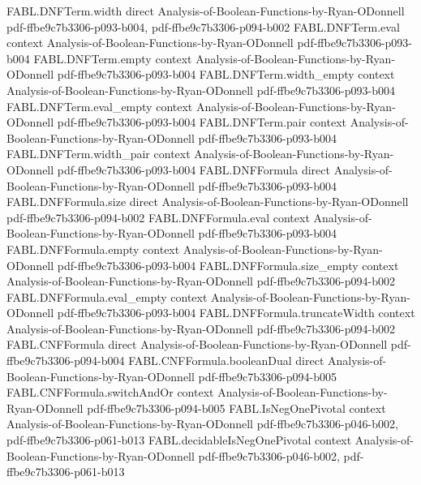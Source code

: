 \begin{theorem}
\proofstep
  {FABL.DNFTerm.width}
  {direct}
  {Analysis-of-Boolean-Functions-by-Ryan-ODonnell}
  {pdf-ffbe9c7b3306-p093-b004,
    pdf-ffbe9c7b3306-p094-b002}
\proofstep
  {FABL.DNFTerm.eval}
  {context}
  {Analysis-of-Boolean-Functions-by-Ryan-ODonnell}
  {pdf-ffbe9c7b3306-p093-b004}
\proofstep
  {FABL.DNFTerm.empty}
  {context}
  {Analysis-of-Boolean-Functions-by-Ryan-ODonnell}
  {pdf-ffbe9c7b3306-p093-b004}
\proofstep
  {FABL.DNFTerm.width_empty}
  {context}
  {Analysis-of-Boolean-Functions-by-Ryan-ODonnell}
  {pdf-ffbe9c7b3306-p093-b004}
\proofstep
  {FABL.DNFTerm.eval_empty}
  {context}
  {Analysis-of-Boolean-Functions-by-Ryan-ODonnell}
  {pdf-ffbe9c7b3306-p093-b004}
\proofstep
  {FABL.DNFTerm.pair}
  {context}
  {Analysis-of-Boolean-Functions-by-Ryan-ODonnell}
  {pdf-ffbe9c7b3306-p093-b004}
\proofstep
  {FABL.DNFTerm.width_pair}
  {context}
  {Analysis-of-Boolean-Functions-by-Ryan-ODonnell}
  {pdf-ffbe9c7b3306-p093-b004}
\proofstep
  {FABL.DNFFormula}
  {direct}
  {Analysis-of-Boolean-Functions-by-Ryan-ODonnell}
  {pdf-ffbe9c7b3306-p093-b004}
\proofstep
  {FABL.DNFFormula.size}
  {direct}
  {Analysis-of-Boolean-Functions-by-Ryan-ODonnell}
  {pdf-ffbe9c7b3306-p094-b002}
\proofstep
  {FABL.DNFFormula.eval}
  {context}
  {Analysis-of-Boolean-Functions-by-Ryan-ODonnell}
  {pdf-ffbe9c7b3306-p093-b004}
\proofstep
  {FABL.DNFFormula.empty}
  {context}
  {Analysis-of-Boolean-Functions-by-Ryan-ODonnell}
  {pdf-ffbe9c7b3306-p093-b004}
\proofstep
  {FABL.DNFFormula.size_empty}
  {context}
  {Analysis-of-Boolean-Functions-by-Ryan-ODonnell}
  {pdf-ffbe9c7b3306-p094-b002}
\proofstep
  {FABL.DNFFormula.eval_empty}
  {context}
  {Analysis-of-Boolean-Functions-by-Ryan-ODonnell}
  {pdf-ffbe9c7b3306-p093-b004}
\proofstep
  {FABL.DNFFormula.truncateWidth}
  {context}
  {Analysis-of-Boolean-Functions-by-Ryan-ODonnell}
  {pdf-ffbe9c7b3306-p094-b002}
\proofstep
  {FABL.CNFFormula}
  {direct}
  {Analysis-of-Boolean-Functions-by-Ryan-ODonnell}
  {pdf-ffbe9c7b3306-p094-b004}
\proofstep
  {FABL.CNFFormula.booleanDual}
  {direct}
  {Analysis-of-Boolean-Functions-by-Ryan-ODonnell}
  {pdf-ffbe9c7b3306-p094-b005}
\proofstep
  {FABL.CNFFormula.switchAndOr}
  {context}
  {Analysis-of-Boolean-Functions-by-Ryan-ODonnell}
  {pdf-ffbe9c7b3306-p094-b005}
\proofstep
  {FABL.IsNegOnePivotal}
  {context}
  {Analysis-of-Boolean-Functions-by-Ryan-ODonnell}
  {pdf-ffbe9c7b3306-p046-b002,
    pdf-ffbe9c7b3306-p061-b013}
\proofstep
  {FABL.decidableIsNegOnePivotal}
  {context}
  {Analysis-of-Boolean-Functions-by-Ryan-ODonnell}
  {pdf-ffbe9c7b3306-p046-b002,
    pdf-ffbe9c7b3306-p061-b013}
\proofstep

\end{theorem}
